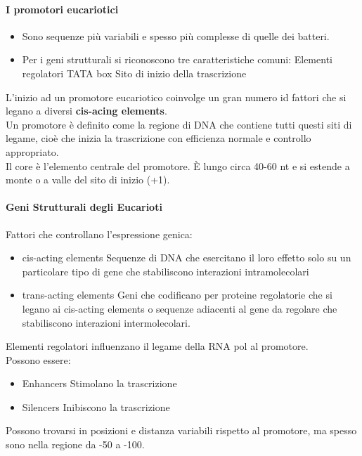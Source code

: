 \documentclass{article}
\begin{document}
\paragraph{I promotori eucariotici}
\begin{itemize}
    \item Sono sequenze più variabili e spesso più complesse di quelle dei batteri.
    \item Per i geni strutturali si riconoscono tre caratteristiche comuni:
    \subitem Elementi regolatori
    \subitem TATA box
    \subitem Sito di inizio della trascrizione
\end{itemize}
L'inizio ad un promotore eucariotico coinvolge un gran numero id fattori che si legano a diversi \textbf{cis-acing elements}.\\
Un promotore è definito come la regione di DNA che contiene tutti questi siti di legame, cioè che inizia la trascrizione con efficienza normale e controllo appropriato.\\
Il core è l'elemento centrale del promotore. È lungo circa 40-60 nt e si estende a monte o a valle del sito di inizio (+1).
\paragraph{Geni Strutturali degli Eucarioti}
Fattori che controllano l'espressione genica:
\begin{itemize}
    \item cis-acting elements
    \subitem Sequenze di DNA che esercitano il loro effetto solo su un particolare tipo di gene che stabiliscono interazioni intramolecolari
    \item trans-acting elements
    \subitem Geni che codificano per proteine regolatorie che si legano ai cis-acting elements o sequenze adiacenti al gene da regolare che stabiliscono interazioni intermolecolari.
\end{itemize}
Elementi regolatori influenzano il legame della RNA pol al promotore.\\
Possono essere:
\begin{itemize}
    \item Enhancers
    \subitem Stimolano la trascrizione 
    \item Silencers
    \subitem Inibiscono la trascrizione
\end{itemize}
Possono trovarsi in posizioni e distanza variabili rispetto al promotore, ma spesso sono nella regione da -50 a -100.
\end{document}
